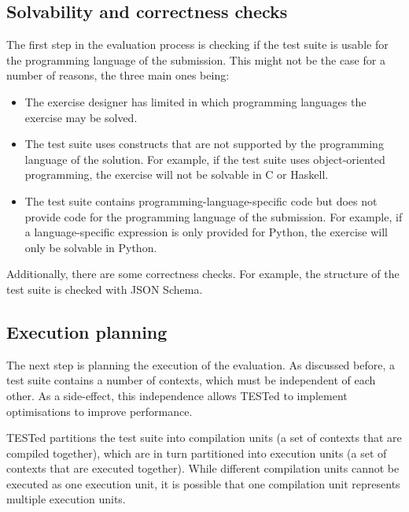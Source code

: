 \documentclass[../main]{subfiles}
\begin{document}
\subsection{Solvability and correctness checks}\label{subsec:solvability-and-correctness-checks}

The first step in the evaluation process is checking if the test suite is usable for the programming language of the submission.
This might not be the case for a number of reasons, the three main ones being:

\begin{itemize}
    \item The exercise designer has limited in which programming languages the exercise may be solved.
    \item The test suite uses constructs that are not supported by the programming language of the solution.
          For example, if the test suite uses object-oriented programming, the exercise will not be solvable in C or Haskell.
    \item The test suite contains programming-language-specific code but does not provide code for the programming language of the submission.
          For example, if a language-specific expression is only provided for Python, the exercise will only be solvable in Python.
\end{itemize}

Additionally, there are some correctness checks.
For example, the structure of the test suite is checked with JSON Schema.

\subsection{Execution planning}\label{subsec:execution-planning}

The next step is planning the execution of the evaluation.
As discussed before, a test suite contains a number of contexts, which must be independent of each other.
As a side-effect, this independence allows TESTed to implement optimisations to improve performance.

TESTed partitions the test suite into compilation units (a set of contexts that are compiled together), which are in turn partitioned into execution units (a set of contexts that are executed together).
While different compilation units cannot be executed as one execution unit, it is possible that one compilation unit represents multiple execution units.
\end{document}

